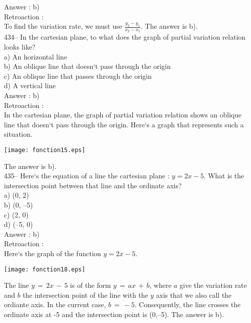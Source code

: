 ﻿\documentclass[letterpaper, 12pt]{article}
\begin{document}
Answer :  b)\\

Retroaction : \\
To find the variation rate, we must use
$\frac{y_2-y_1}{x_2-x_1}$.  The answer is b).\\

434--  In the cartesian plane, to what does the graph of partial variation relation looks like?\\
a) An horizontal line\\
b) An oblique line that doesn`t pass through the origin\\
c) An oblique line that passes through the origin\\
d) A vertical line\\

Answer :  b)\\

Retroaction : \\
In the cartesian plane, the graph of partial variation relation shows an oblique line that doesn`t pass through the origin. Here`s a graph that represents such a situation.\\
    \begin{center}
    \texttt{[image: fonction15.eps]}
    \end{center}

The answer is b).\\

435-- Here`s the equation of a line the cartesian plane : $y=2x-5$.
What is the intersection point between that line and the ordinate axis?\\
a) (0, 2)\\
b) (0, --5)\\
c) (2, 0)\\
d) (--5, 0)\\

Answer :  b)\\

Retroaction : \\
Here`s the graph of the function $y=2x-5$.\\
    \begin{center}
    \texttt{[image: fonction18.eps]}
    \end{center}

The line $y\,=\,2x\,-\,5$ is of the form $y\,=\,ax\,+\,b$, where
$a$ give the variation rate and $b$ the intersection point of the line with the $y$ axis that we also call the ordiante axis.
In the current case, $b\,=\,-5$. Consequently, the line crosses the ordinate axis at -5 and the intersection point is (0,--5).
The answer is b).\\
\end{document}
